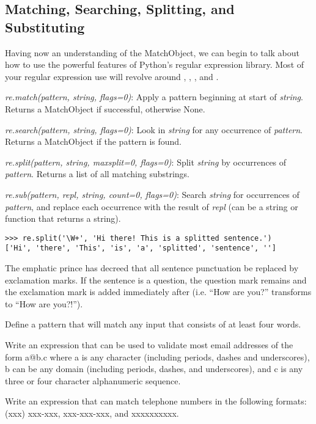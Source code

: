 \subsection*{Matching, Searching, Splitting, and Substituting}
Having now an understanding of the MatchObject, we can begin to talk about how to use the powerful features of Python's
regular expression library.
Most of your regular expression use will revolve around , , , and .
\begin{description}
\item \emph{re.match(pattern, string, flags=0)}:  Apply a pattern beginning at start of \emph{string}.  Returns a MatchObject if successful, otherwise None.
\item \emph{re.search(pattern, string, flags=0)}:  Look in \emph{string} for any occurrence of \emph{pattern}.  Returns a MatchObject if the pattern is found.
\item \emph{re.split(pattern, string, maxsplit=0, flags=0)}: Split \emph{string} by occurrences of \emph{pattern}.  Returns a list of all matching substrings.
\item \emph{re.sub(pattern, repl, string, count=0, flags=0)}: Search \emph{string} for occurrences of \emph{pattern}, and replace each occurrence with the result of \emph{repl} (can be a string or function that returns a string).
\end{description}

\begin{lstlisting}
>>> re.split('\W+', 'Hi there! This is a splitted sentence.')
['Hi', 'there', 'This', 'is', 'a', 'splitted', 'sentence', '']
\end{lstlisting}

\begin{problem}
The emphatic prince has decreed that all sentence punctuation be replaced by exclamation marks.  If the sentence is a question, the question mark remains and the exclamation mark is added immediately after (i.e. ``How are you?'' transforms to ``How are you?!'').  
\end{problem}

\begin{problem}
Define a pattern that will match any input that consists of at least four words.
\end{problem}

\begin{problem}
Write an expression that can be used to validate most email addresses of the form a@b.c where a is any character (including periods, dashes and underscores), b can be any domain (including periods, dashes, and underscores), and c is any three or four character alphanumeric sequence.
\label{prob:emailvaldiator}
\end{problem}

\begin{problem}
Write an expression that can match telephone numbers in the following formats: (xxx) xxx-xxx, xxx-xxx-xxx, and xxxxxxxxxx.
\end{problem}

